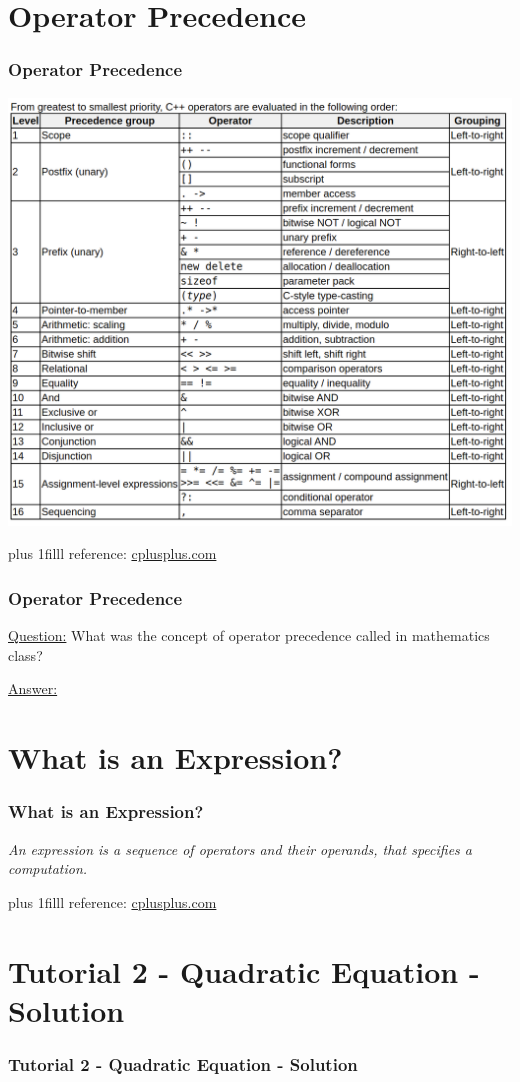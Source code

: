 \documentclass[fleqn]{beamer} %
\newcommand{\sectiontitleIII}{Operator Precedence}
\newcommand{\sectiontitleIV}{What is an Expression?}
\newcommand{\sectiontitleV}{Tutorial 2 - Quadratic Equation - Solution}
\newcommand{\btVFill}{\vskip0pt plus 1filll}
\begin{document}
\section{\sectiontitleIII}

	\begin{frame}[label=sectionIII] \small
		\frametitle{\sectiontitleIII}
		
		\includegraphics[scale=.19]{operator_precedence.png}
		
		
		\btVFill
		\tiny{reference: \href{https://www.cplusplus.com/doc/tutorial/operators/}{cplusplus.com} } 
	\end{frame}

	\begin{frame} \small
		\frametitle{\sectiontitleIII}
		
		\underline{Question:} What was the concept of operator precedence called in mathematics class? \vspace{15mm}
		
		\underline{Answer:}
		
	\end{frame}


\section{\sectiontitleIV}	
	\begin{frame}[label=sectionIV] \small
		\frametitle{\sectiontitleIV}    
	
		\vspace{15mm}
	
		{\it An expression is a sequence of operators and their operands, that specifies a computation.}

		\btVFill
		\tiny{reference: \href{https://www.cplusplus.com/doc/tutorial/operators/}{cplusplus.com} } 
	\end{frame}

\section{\sectiontitleV}	
	\begin{frame}[label=sectionV,containsverbatim] \small
	\frametitle{\sectiontitleV}    
	

	\end{frame}
\end{document}
